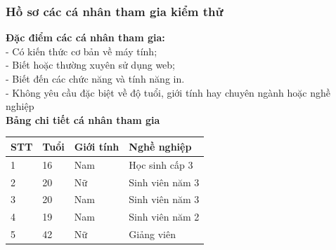 \documentclass[a4paper]{article}
\begin{document}
\subsubsection{Hồ sơ các cá nhân tham gia kiểm thử}
\textbf{ Đặc điểm các cá nhân tham gia: }\\
- Có kiến thức cơ bản về máy tính;\\ 
- Biết hoặc thường xuyên sử dụng web;\\
- Biết đến các chức năng và tính năng in.\\
- Không yêu cầu đặc biệt về độ tuổi, giới tính hay chuyên ngành hoặc nghề nghiệp\\
\textbf{ Bảng chi tiết cá nhân tham gia }
\begin{table}[]
\begin{tabular}{|l|l|l|l|}
\hline
STT & Tuổi & Giới tính & Nghề nghiệp     \\ \hline
1   & 16   & Nam       & Học sinh cấp 3  \\ \hline
2   & 20   & Nữ        & Sinh viên năm 3 \\ \hline
3   & 20   & Nam       & Sinh viên năm 3 \\ \hline
4   & 19   & Nam       & Sinh viên năm 2 \\ \hline
5   & 42   & Nữ        & Giảng viên      \\ \hline
\end{tabular}
\end{table}
\end{document}
